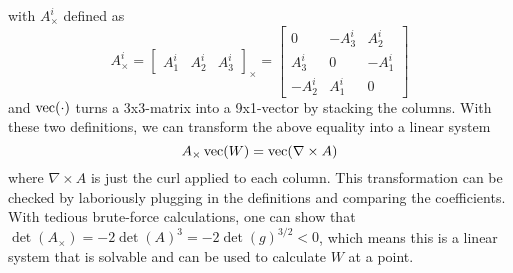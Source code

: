 \documentclass[../thesis.tex]{subfiles}
\begin{document}
with $A^i_{\times}$ defined as
$$A^i_{\times} = \begin{bmatrix}
  A^i_1 & A^i_2 & A^i_3
\end{bmatrix}_{\times} =
\begin{bmatrix}
  0 & -A^i_3 & A^i_2 \\
  A^i_3 & 0 & -A^i_1 \\
  -A^i_2 & A^i_1 & 0
\end{bmatrix}$$ and $\operatorname{vec}(\cdot)$ turns a 3x3-matrix into a 9x1-vector by stacking the columns.
With these two definitions, we can transform the above equality into a linear system
$$A_{\times} \operatorname{vec}(W) = \operatorname{vec} (\nabla \times A)$$
where $\nabla \times A$ is just the curl applied to each column. This transformation can be checked by laboriously plugging in the definitions and comparing the coefficients.
With tedious brute-force calculations, one can show that $\det(A_{\times})=-2\det(A)^3=-2\det(g)^{3/2}<0$, which
means this is a linear system that is solvable and can be used to calculate $W$ at a point.
\end{document}

